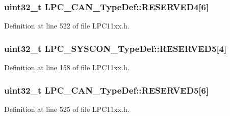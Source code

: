 \subsubsection[{\texorpdfstring{R\+E\+S\+E\+R\+V\+E\+D4}{RESERVED4}}]{\setlength{\rightskip}{0pt plus 5cm}uint32\+\_\+t L\+P\+C\+\_\+\+C\+A\+N\+\_\+\+Type\+Def\+::\+R\+E\+S\+E\+R\+V\+E\+D4\mbox{[}6\mbox{]}}\hypertarget{group___l_p_c11xx___definitions_gab147f256c7264f9cf1d23e58138ca1f5}{}\label{group___l_p_c11xx___definitions_gab147f256c7264f9cf1d23e58138ca1f5}


Definition at line 522 of file L\+P\+C11xx.\+h.

\subsubsection[{\texorpdfstring{R\+E\+S\+E\+R\+V\+E\+D5}{RESERVED5}}]{\setlength{\rightskip}{0pt plus 5cm}uint32\+\_\+t L\+P\+C\+\_\+\+S\+Y\+S\+C\+O\+N\+\_\+\+Type\+Def\+::\+R\+E\+S\+E\+R\+V\+E\+D5\mbox{[}4\mbox{]}}\hypertarget{group___l_p_c11xx___definitions_gac85209a97e506caccc4d0fe28f7fc63a}{}\label{group___l_p_c11xx___definitions_gac85209a97e506caccc4d0fe28f7fc63a}


Definition at line 158 of file L\+P\+C11xx.\+h.

\subsubsection[{\texorpdfstring{R\+E\+S\+E\+R\+V\+E\+D5}{RESERVED5}}]{\setlength{\rightskip}{0pt plus 5cm}uint32\+\_\+t L\+P\+C\+\_\+\+C\+A\+N\+\_\+\+Type\+Def\+::\+R\+E\+S\+E\+R\+V\+E\+D5\mbox{[}6\mbox{]}}\hypertarget{group___l_p_c11xx___definitions_gada2e33a50c45e694cde5d08bca108a07}{}\label{group___l_p_c11xx___definitions_gada2e33a50c45e694cde5d08bca108a07}


Definition at line 525 of file L\+P\+C11xx.\+h.

